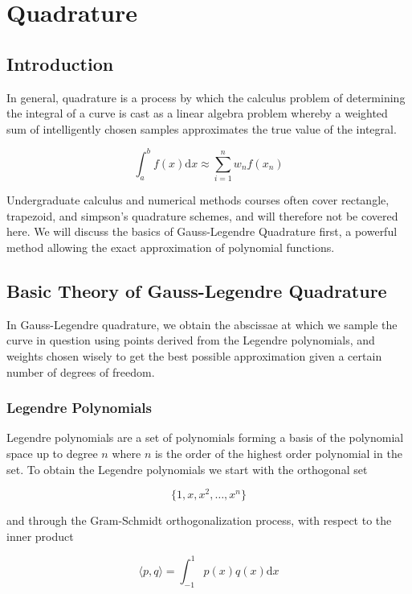 


	
\chapter{Quadrature}
\label{ch:quadrature}


\section{Introduction}
\label{sec:quadratureintro}

In general, quadrature is a process by which the calculus problem of determining the integral of a curve is cast as a linear algebra problem whereby a weighted sum of intelligently chosen samples approximates the true value of the integral.

\[ \int_{a}^{b} f(x) \mathrm{d}x \approx \sum_{i=1}^n w_n f(x_n) \]

Undergraduate calculus and numerical methods courses often cover rectangle, trapezoid, and simpson's quadrature schemes, and will therefore not be covered here. We will discuss the basics of Gauss-Legendre Quadrature first, a powerful method allowing the exact approximation of polynomial functions.

\section{Basic Theory of Gauss-Legendre Quadrature}
In Gauss-Legendre quadrature, we obtain the abscissae at which we sample the curve in question using points derived from the Legendre polynomials, and weights chosen wisely to get the best possible approximation given a certain number of degrees of freedom.

\subsection{Legendre Polynomials}
Legendre polynomials are a set of polynomials forming a basis of the polynomial space up to degree $n$ where $n$ is the order of the highest order polynomial in the set. To obtain the Legendre polynomials we start with the orthogonal set

\[  \{ 1, x, x^2, \ldots , x^n \}  \]

and through the Gram-Schmidt orthogonalization process, with respect to the inner product

\[ \langle p,q \rangle = \int^1_{-1} p(x) q(x) \mathrm{d}x \]


